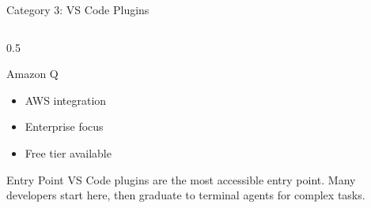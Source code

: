 \documentclass[aspectratio=169,11pt]{beamer}
\begin{document}
\begin{frame}{Category 3: VS Code Plugins}
\begin{columns}[T]
\begin{column}{0.5\textwidth}
            \begin{block}{Amazon Q}
                \begin{itemize}
                    \item AWS integration
                    \item Enterprise focus
                    \item Free tier available
                \end{itemize}
            \end{block}

            \vspace{0.2cm}
            \begin{alertblock}{Entry Point}
                VS Code plugins are the most accessible entry point. Many developers start here, then graduate to terminal agents for complex tasks.
            \end{alertblock}
        \end{column}
    \end{columns}

\end{frame}
\end{document}

